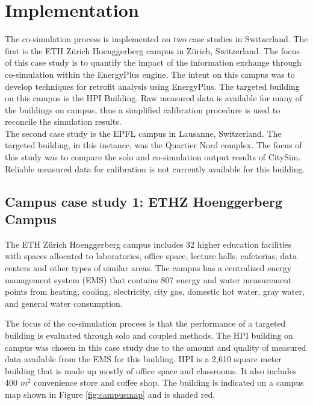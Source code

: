 \documentclass{tBPS2e}
\theoremstyle{plain}
\theoremstyle{definition}
\theoremstyle{remark}
\begin{document}
\section{Implementation}\label{Implementation and results}
The co-simulation process is implemented on two case studies in Switzerland.
The first is the ETH Z\"urich Hoenggerberg campus in Z\"urich, Switzerland.
The focus of this case study is to quantify the impact of the information
exchange through co-simulation within the EnergyPlus engine. The intent on
this campus was to develop techniques for retrofit analysis using EnergyPlus.
The targeted building on this campus is the HPI Building. Raw measured data is
available for many of the buildings on campus, thus a simplified calibration
procedure is used to reconcile the simulation results.\\

The second case study is the EPFL campus in Lausanne, Switzerland. The
targeted building, in this instance, was the Quartier Nord complex. The focus of
this study was to compare the solo and co-simulation output results of CitySim.
Reliable measured data for calibration is not currently available for this
building.

\subsection{Campus case study 1: ETHZ Hoenggerberg Campus}
The ETH Z\"urich Hoenggerberg campus includes 32 higher education facilities
with spaces allocated to laboratories, office space, lecture halls,
 cafeterias, data centers and other types of similar areas. The campus has a
 centralized energy management system (EMS) that contains 807 energy and water measurement 
 points from heating, cooling, electricity, city gas, domestic hot water, gray water, and general water consumption. 

The focus of the co-simulation process is that the performance of a targeted
building is evaluated through solo and coupled methods. The HPI building on
campus was chosen in this case study due to the amount and quality of measured
data available from the EMS for this building. HPI is a 2,610 square meter
building that is made up mostly of office space and classrooms. It also
includes 400 $m^2$ convenience store and coffee shop. The building is
indicated on a campus map shown in Figure \ref{fig:campusmap} and is shaded
red.
\end{document}
